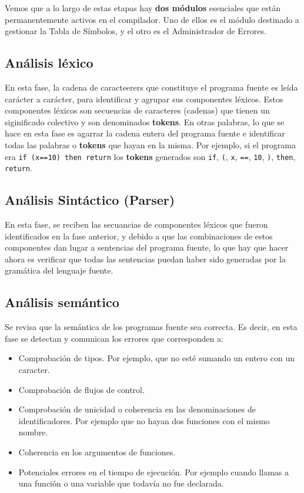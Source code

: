\documentclass[12pt]{article}
\begin{document}
Vemos que a lo largo de estas etapas hay \textbf{dos módulos} esenciales que están permanentemente activos en el compilador. Uno de ellos es el módulo destinado a gestionar la Tabla de Símbolos, y el otro es el Administrador de Errores.

\subsection{Análisis léxico}
En esta fase, la cadena de caracteerers que constituye el programa fuente es leída carácter a carácter, para identificar y agrupar sus componentes léxicos. Estos componentes léxicos son secuencias de caracteres (cadenas) que tienen un siginificado colectivo y son denominados \textbf{tokens}.
En otras palabras, lo que se hace en esta fase es agarrar la cadena entera del programa fuente e identificar todas las palabras o \textbf{tokens} que hayan en la misma. Por ejemplo, si el programa era \verb|if (x==10) then return| los \textbf{tokens} generados son \verb|if|, \verb|(|, \verb|x|, \verb|==|, \verb|10|, \verb|)|, \verb|then|, \verb|return|.

\subsection{Análisis Sintáctico (Parser)}
En esta fase, se reciben las secuancias de componentes léxicos que fueron identificados en la fase anterior, y debido a que las combinaciones de estos componentes dan lugar a sentencias del programa fuente, lo que hay que hacer ahora es verificar que todas las sentencias puedan haber sido generadas por la gramática del lenguaje fuente.

\subsection{Análisis semántico}
Se revisa que la semántica de los programas fuente sea correcta. Es decir, en esta fase se detectan y comunican los errores que corresponden a:
\begin{itemize}
	\item Comprobación de tipos. Por ejemplo, que no esté sumando un entero con un caracter.

	\item Comprobación de flujos de control.

	\item Comprobación de unicidad o coherencia en las denominaciones de identificadores. Por ejemplo que no hayan dos funciones con el mismo nombre.

	\item Coherencia en los argumentos de funciones.

	\item Potenciales errores en el tiempo de ejecución. Por ejemplo cuando llamas a una función o una variable que todavía no fue declarada.
\end{itemize}
\end{document}
